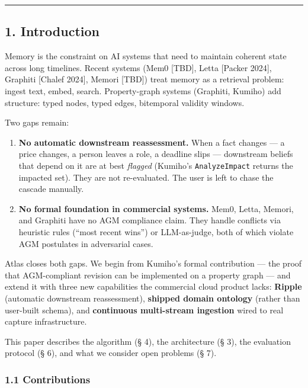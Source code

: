 \documentclass[
  11pt,
]{article}
\begin{document}
\begin{center}\rule{0.5\linewidth}{0.5pt}\end{center}

\subsection{1. Introduction}\label{introduction}

Memory is the constraint on AI systems that need to maintain coherent
state across long timelines. Recent systems (Mem0 {[}TBD{]}, Letta
{[}Packer 2024{]}, Graphiti {[}Chalef 2024{]}, Memori {[}TBD{]}) treat
memory as a retrieval problem: ingest text, embed, search.
Property-graph systems (Graphiti, Kumiho) add structure: typed nodes,
typed edges, bitemporal validity windows.

Two gaps remain:

\begin{enumerate}
\def\labelenumi{\arabic{enumi}.}
\item
  \textbf{No automatic downstream reassessment.} When a fact changes ---
  a price changes, a person leaves a role, a deadline slips ---
  downstream beliefs that depend on it are at best \emph{flagged}
  (Kumiho's \texttt{AnalyzeImpact} returns the impacted set). They are
  not re-evaluated. The user is left to chase the cascade manually.
\item
  \textbf{No formal foundation in commercial systems.} Mem0, Letta,
  Memori, and Graphiti have no AGM compliance claim. They handle
  conflicts via heuristic rules (``most recent wins'') or LLM-as-judge,
  both of which violate AGM postulates in adversarial cases.
\end{enumerate}

Atlas closes both gaps. We begin from Kumiho's formal contribution ---
the proof that AGM-compliant revision can be implemented on a property
graph --- and extend it with three new capabilities the commercial cloud
product lacks: \textbf{Ripple} (automatic downstream reassessment),
\textbf{shipped domain ontology} (rather than user-built schema), and
\textbf{continuous multi-stream ingestion} wired to real capture
infrastructure.

This paper describes the algorithm (§ 4), the architecture (§ 3), the
evaluation protocol (§ 6), and what we consider open problems (§ 7).

\subsubsection{1.1 Contributions}\label{contributions}
\end{document}
